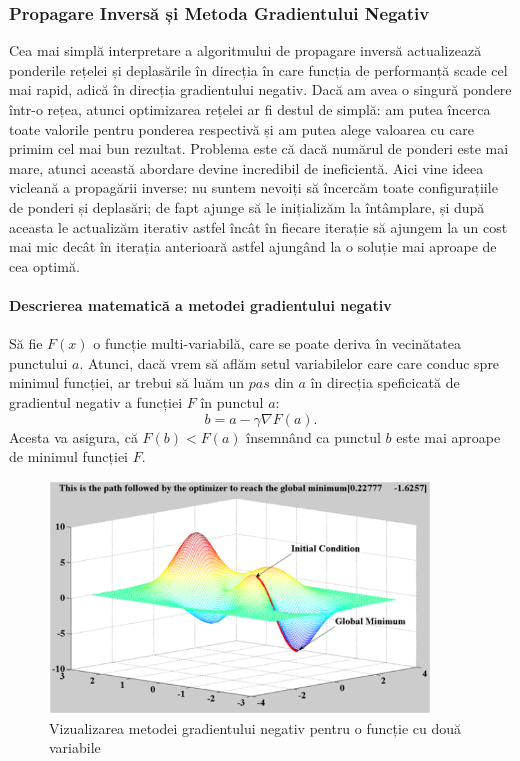 \subsubsection{Propagare Inversă și Metoda Gradientului Negativ}
Cea mai simplă interpretare a algoritmului de propagare inversă actualizează ponderile rețelei și deplasările în direcția în care funcția de performanță scade cel mai rapid, adică în direcția gradientului negativ.\newline
Dacă am avea o singură pondere într-o rețea, atunci optimizarea rețelei ar fi destul de simplă: am putea încerca toate valorile pentru ponderea respectivă și am putea alege valoarea cu care primim cel mai bun rezultat. Problema este că dacă numărul de ponderi este mai mare, atunci această abordare devine incredibil de ineficientă. Aici vine ideea vicleană a propagării inverse: nu suntem nevoiți să încercăm toate configurațiile de ponderi și deplasări; de fapt ajunge să le inițializăm la întâmplare, și după aceasta le actualizăm iterativ astfel încât în fiecare iterație să ajungem la un cost mai mic decât în iterația anterioară astfel ajungând la o soluție mai aproape de cea optimă.\newline


\paragraph{Descrierea matematică a metodei gradientului negativ}
Să fie $F(x)$ o funcție multi-variabilă, care se poate deriva în vecinătatea punctului $a$. Atunci, dacă vrem să aflăm setul variabilelor care care conduc spre minimul funcției, ar trebui să luăm un $pas$ din $a$ în direcția speficicată de gradientul negativ a funcției $F$ în punctul $a$:
\begin{equation}
	b = a - \gamma \nabla F(a).
\end{equation}
Acesta va asigura, că $F(b) < F(a)$ însemnând ca punctul $b$ este mai aproape de minimul funcției $F$.


\begin{figure}[h!]
    	\centering
	\captionsetup{justification=centering, margin=2cm}
	\includegraphics[width=0.9\textwidth]{figures/gradient_descent.png}
	\caption{Vizualizarea metodei gradientului negativ pentru o funcție cu două variabile \cite{arn}}
	\label{fig:gradient_descent}
\end{figure}

